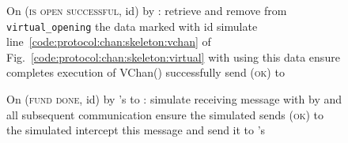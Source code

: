 \begin{figure}[H]
\begin{simulatorbox}{\simulator}
\begin{algorithmic}[1]
      \State On (\textsc{is open successful}, id) by \fchan:
      \Indent
        \State retrieve and remove from \texttt{virtual\_opening} the data
        marked with id
        \State simulate line~\ref{code:protocol:chan:skeleton:vchan} of
        Fig.~\ref{code:protocol:chan:skeleton:virtual} with \alice using this
        data
        \State ensure \alice completes execution of VChan() successfully
        \State send (\textsc{ok}) to \fchan
      \EndIndent
      \Statex

      \State On (\textsc{fund done}, id) by \fchan's \alice to \charlie:
      \Indent
        \State simulate receiving message with \charlie by \alice and all
        subsequent communication
        \State ensure the simulated \charlie sends (\textsc{ok}) to the
        simulated \alice
        \State intercept this message and send it to \fchan's \alice
      \EndIndent
    \end{algorithmic}
  \end{simulatorbox}
  \caption{}
  \label{code:simulator}
\end{figure}
